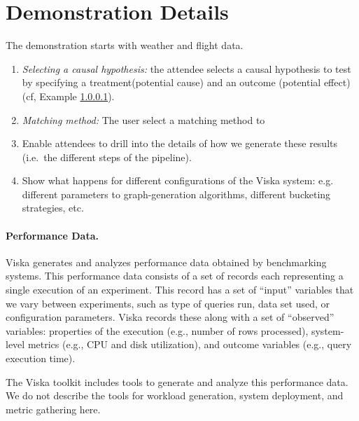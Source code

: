 \section{Demonstration Details}

The demonstration starts with weather and flight data.   

\begin{enumerate}
\item {\it Selecting a causal hypothesis:} the attendee selects a causal hypothesis to test by 
specifying a treatment(potential cause) and an outcome (potential effect) (cf, Example \ref{}).  

\item {\it Matching method:} The user select a matching method to 
\item Enable attendees to drill into the details of how we generate these
results (i.e.\, the different steps of the pipeline).
\item Show what happens for different configurations of the Viska system:
e.g.\, different parameters to graph-generation algorithms, different bucketing
strategies, etc.
\end{enumerate}

\paragraph{Performance Data.}

Viska generates and analyzes performance data obtained by benchmarking
systems. This performance data consists of a set of records
each representing a single execution of an experiment. This record has
a set of ``input'' variables that we vary between experiments, such as
type of queries run, data set used, or configuration parameters. Viska
records these along with a set of ``observed'' variables: properties
of the execution (e.g., number of rows processed), system-level
metrics (e.g., CPU and disk utilization), and outcome variables (e.g.,
query execution time).

The Viska toolkit includes tools to generate and analyze this
performance data. We do not describe the tools for workload
generation, system deployment, and metric gathering here.



